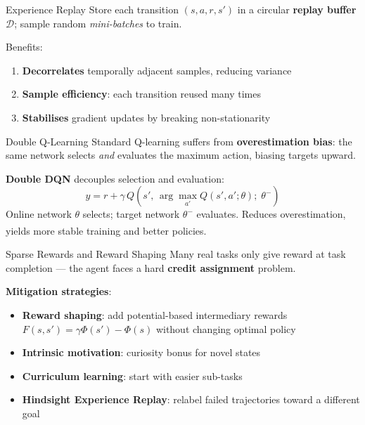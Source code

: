\begin{v3topic}{Experience Replay}
        Store each transition $(s, a, r, s')$ in a circular \textbf{replay
        buffer} $\mathcal{D}$; sample random \emph{mini-batches} to train.

        Benefits:
        \begin{enumerate}
            \item \textbf{Decorrelates} temporally adjacent samples, reducing
                  variance
            \item \textbf{Sample efficiency}: each transition reused many times
            \item \textbf{Stabilises} gradient updates by breaking
                  non-stationarity
        \end{enumerate}
        \textsuperscript{\cite[][p.~351]{hurbansGrokkingArtificialIntelligence2020}}

\end{v3topic}
\begin{v3topic}{Double Q-Learning}
        Standard Q-learning suffers from \textbf{overestimation bias}: the
        same network selects \emph{and} evaluates the maximum action, biasing
        targets upward.

        \textbf{Double DQN} decouples selection and evaluation:
        \begin{equation}
            y = r + \gamma\, Q\!\left(s',\, \arg\max_{a'} Q(s',a';\theta);\;\theta^-\right)
        \end{equation}
        Online network $\theta$ selects; target network $\theta^-$ evaluates.
        Reduces overestimation, yields more stable training and better
        policies.\textsuperscript{\cite[][p.~353]{hurbansGrokkingArtificialIntelligence2020}}

\end{v3topic}
\begin{v3topic}{Sparse Rewards and Reward Shaping}
        Many real tasks only give reward at task completion --- the agent faces
        a hard \textbf{credit assignment} problem.

        \textbf{Mitigation strategies}:
        \begin{itemize}
            \item \textbf{Reward shaping}: add potential-based intermediary
                  rewards $F(s,s') = \gamma \Phi(s') - \Phi(s)$ without
                  changing optimal policy
            \item \textbf{Intrinsic motivation}: curiosity bonus for novel states
            \item \textbf{Curriculum learning}: start with easier sub-tasks
            \item \textbf{Hindsight Experience Replay}: relabel failed
                  trajectories toward a different goal
        \end{itemize}
        \textsuperscript{\cite[][p.~357]{hurbansGrokkingArtificialIntelligence2020}}

\end{v3topic}
